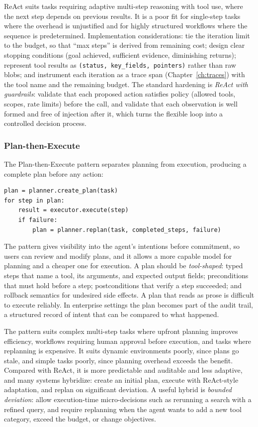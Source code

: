 \documentclass[11pt]{book}
\begin{document}
ReAct suits tasks requiring adaptive multi-step reasoning with tool use, where the next step depends on previous results. It is a poor fit for single-step tasks where the overhead is unjustified and for highly structured workflows where the sequence is predetermined. Implementation considerations: tie the iteration limit to the budget, so that ``max steps'' is derived from remaining cost; design clear stopping conditions (goal achieved, sufficient evidence, diminishing returns); represent tool results as \texttt{(status, key\_fields, pointers)} rather than raw blobs; and instrument each iteration as a trace span (Chapter~\ref{ch:traces}) with the tool name and the remaining budget. The standard hardening is \textit{ReAct with guardrails}: validate that each proposed action satisfies policy (allowed tools, scopes, rate limits) before the call, and validate that each observation is well formed and free of injection after it, which turns the flexible loop into a controlled decision process.

\subsubsection{Plan-then-Execute}

The Plan-then-Execute pattern separates planning from execution, producing a complete plan before any action:

{\footnotesize
\begin{verbatim}
plan = planner.create_plan(task)
for step in plan:
    result = executor.execute(step)
    if failure:
        plan = planner.replan(task, completed_steps, failure)
\end{verbatim}
}

The pattern gives visibility into the agent's intentions before commitment, so users can review and modify plans, and it allows a more capable model for planning and a cheaper one for execution. A plan should be \textit{tool-shaped}: typed steps that name a tool, its arguments, and expected output fields; preconditions that must hold before a step; postconditions that verify a step succeeded; and rollback semantics for undesired side effects. A plan that reads as prose is difficult to execute reliably. In enterprise settings the plan becomes part of the audit trail, a structured record of intent that can be compared to what happened.

The pattern suits complex multi-step tasks where upfront planning improves efficiency, workflows requiring human approval before execution, and tasks where replanning is expensive. It suits dynamic environments poorly, since plans go stale, and simple tasks poorly, since planning overhead exceeds the benefit. Compared with ReAct, it is more predictable and auditable and less adaptive, and many systems hybridize: create an initial plan, execute with ReAct-style adaptation, and replan on significant deviation. A useful hybrid is \textit{bounded deviation}: allow execution-time micro-decisions such as rerunning a search with a refined query, and require replanning when the agent wants to add a new tool category, exceed the budget, or change objectives.
\end{document}
